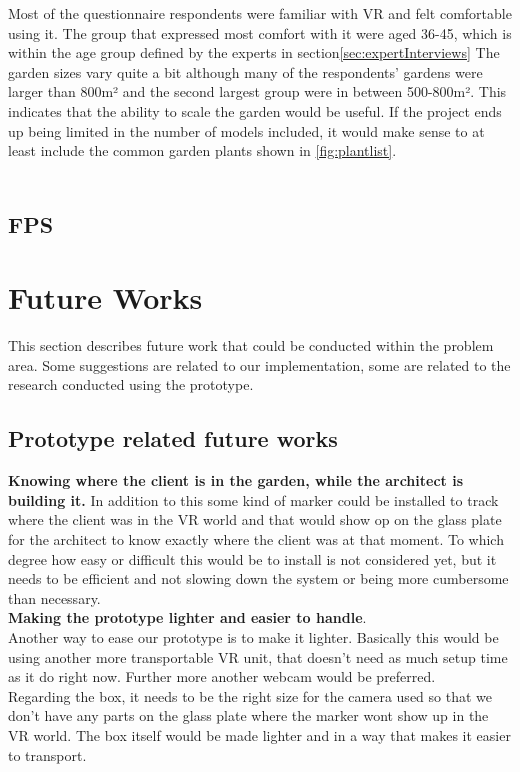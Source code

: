 Most of the questionnaire respondents were familiar with VR and felt comfortable using it. The group that expressed most comfort with it were aged 36-45, which is within the age group defined by the experts in section\autoref{sec:expertInterviews}
The garden sizes vary quite a bit although many of the respondents' gardens were larger than 800m² and the second largest group were in between 500-800m². This indicates that the ability to scale the garden would be useful. If the project ends up being limited in the number of models included, it would make sense to at least include the common garden plants shown in \autoref{fig:plantlist}.\\\\
\section*{FPS}



\chapter{Future Works}
This section describes future work that could be conducted within the problem area. Some suggestions are related to our implementation, some are related to the research conducted using the prototype.
\section{Prototype related future works}
\textbf{Knowing where the client is in the garden, while the architect is building it.} In addition to this some kind of marker could be installed to track where the client was in the VR world and that would show op on the glass plate for the architect to know exactly where the client was at that moment. To which degree how easy or difficult this would be to install is not considered yet, but it needs to be efficient and not slowing down the system or being more cumbersome than necessary.\\

\textbf{Making the prototype lighter and easier to handle}.\\
Another way to ease our prototype is to make it lighter. Basically this would be using another more transportable VR unit, that doesn't need as much setup time as it do right now. Further more another webcam would be preferred.\\
Regarding the box, it needs to be the right size for the camera used so that we don't have any parts on the glass plate where the marker wont show up in the VR world. The box itself would be made lighter and in a way that makes it easier to transport.\\


